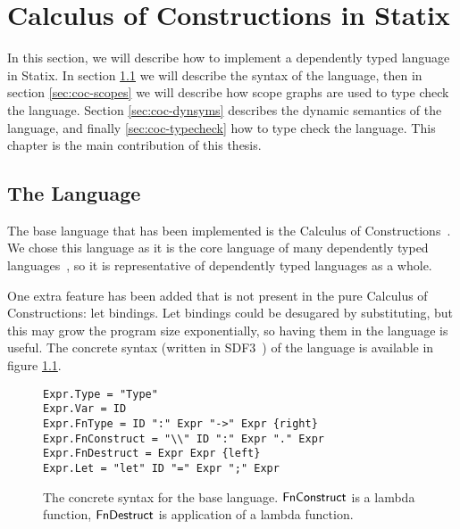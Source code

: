 \chapter{Calculus of Constructions in Statix}
\label{chap:baselang}

In this section, we will describe how to implement a dependently typed language in Statix. In section \ref{sec:coc-syntax} we will describe the syntax of the language, then in section \ref{sec:coc-scopes} we will describe how scope graphs are used to type check the language. Section \ref{sec:coc-dynsyms} describes the dynamic semantics of the language, and finally \ref{sec:coc-typecheck} how to type check the language. This chapter is the main contribution of this thesis.

\section{The Language}
\label{sec:coc-syntax}

The base language that has been implemented is the Calculus of Constructions~\cite{Coquand_Huet_1988}. We chose this language as it is the core language of many dependently typed languages~\cite{core_coq}\cite{lean}, so it is representative of dependently typed languages as a whole.

One extra feature has been added that is not present in the pure Calculus of Constructions: let bindings. Let bindings could be desugared by substituting, but this may grow the program size exponentially, so having them in the language is useful. The concrete syntax (written in SDF3~\cite{sdf3}) of the language is available in figure \ref{fig:syntax}.

\begin{figure}[h]
\lstset{language=SDF3}
\begin{lstlisting}
Expr.Type = "Type"
Expr.Var = ID
Expr.FnType = ID ":" Expr "->" Expr {right}
Expr.FnConstruct = "\\" ID ":" Expr "." Expr
Expr.FnDestruct = Expr Expr {left}
Expr.Let = "let" ID "=" Expr ";" Expr
\end{lstlisting}
\lstset{language=base}
\caption{The concrete syntax for the base language. $\mathsf{FnConstruct}$ is a lambda function, $\mathsf{FnDestruct}$ is application of a lambda function.}
\label{fig:syntax}
\end{figure}

